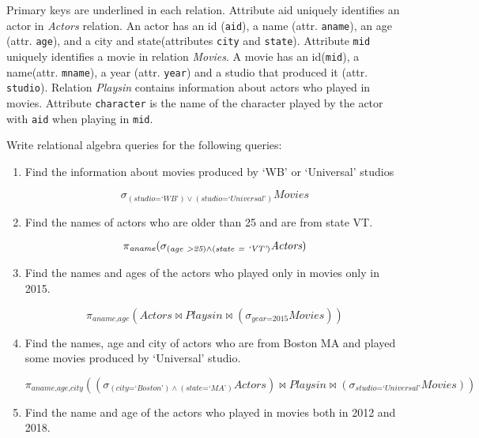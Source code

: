 \documentclass[letterpaper, 11pt]{article}
\begin{document}
Primary keys are underlined in each relation. Attribute aid uniquely identifies an actor in \textit{Actors} relation. An actor has an id (\texttt{aid}), a name (attr. \texttt{aname}), an age (attr. \texttt{age}), and a city and state(attributes \texttt{city} and \texttt{state}). Attribute \texttt{mid} uniquely identifies a movie in relation \textit{Movies}. A movie has an id(\texttt{mid}), a name(attr. \texttt{mname}), a year (attr. \texttt{year}) and a studio that produced it (attr. \texttt{studio}). Relation \textit{Playsin} contains information about actors who played in movies. Attribute \texttt{character} is the name of the character played by the actor with \texttt{aid} when playing in \texttt{mid}.

Write relational algebra queries for the following queries:
\begin{enumerate}[label={\alph*}),leftmargin=*]
    \item Find the information about movies produced by `WB' or `Universal' studios
    \begin{tcolorbox}
    \[\sigma_{(\textit{studio=`WB'}) \vee (\textit{studio=`Universal'})}\textit{Movies}\]    
    \end{tcolorbox}
    \item Find the names of actors who are older than 25 and are from state VT.
    \begin{tcolorbox}
    \[\pi_{\textit{aname}}(\sigma_{(\textit{age \textgreater 25}) \wedge (\textit{state = `VT'})}\textit{Actors})\]
    \end{tcolorbox}    
    \item Find the names and ages of the actors who played only in movies only in 2015.
    \begin{tcolorbox}
    \[\pi_{\textit{aname,age}}(\textit{Actors} \bowtie \textit{Playsin} \bowtie (\sigma_{\textit{year=2015}}\textit{Movies}))\]
    \end{tcolorbox}    
    \item Find the names, age and city of actors who are from Boston MA and played some movies produced by `Universal' studio.
    \begin{tcolorbox}
    \[\pi_{\textit{aname,age,city}}((\sigma_{(\textit{city=`Boston'})\wedge (\textit{state=`MA'})}\textit{Actors}) \bowtie \textit{Playsin} \bowtie (\sigma_{\textit{studio=`Universal'}}\textit{Movies}))\]
    \end{tcolorbox}    
    \item Find the name and age of the actors who played in movies both in 2012 and 2018.

\end{enumerate}
\end{document}
